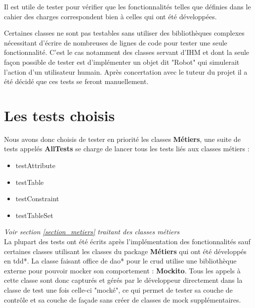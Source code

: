Il est utile de tester pour vérifier que les fonctionnalités telles que définies dans le cahier des charges correspondent bien à celles qui ont été développées.

Certaines classes ne sont pas testables sans utiliser des bibliothèques complexes nécessitant d'écrire de nombreuses de lignes de code pour tester une seule fonctionnalité. C'est le cas notamment des classes servant d'IHM et dont la seule façon possible de tester est d'implémenter un objet dit "Robot" qui simulerait l'action d'un utilisateur humain. Après concertation avec le tuteur du projet il a été décidé que ces tests se feront manuellement.

\section{Les tests choisis}

Nous avons donc choisis de tester en priorité les classes \textbf{Métiers}, une suite de tests appelés \textbf{AllTests} se charge  de lancer tous les tests liés aux classes métiers :
\\

\begin{itemize}
	\item testAttribute
	\item testTable
	\item testConstraint
	\item testTableSet
\end{itemize}

\textit{Voir section \ref{section_metiers} traitant des classes métiers}
\\


La plupart des tests ont été écrits après l'implémentation des fonctionnalités sauf certaines classes utilisant les classes du package \textbf{Métiers} qui ont été développés en \gls{tdd}*.
\medbreak
La classe faisant office de \gls{dao}* pour le \gls{crud} utilise une bibliothèque externe pour pouvoir mocker son comportement : \textbf{Mockito}. Tous les appels à cette classe sont donc capturés et gérés par le développeur directement dans la classe de test une fois celle-ci "mocké", ce qui permet de tester sa couche de contrôle et sa couche de façade sans créer de classes de \gls{mock} supplémentaires.

